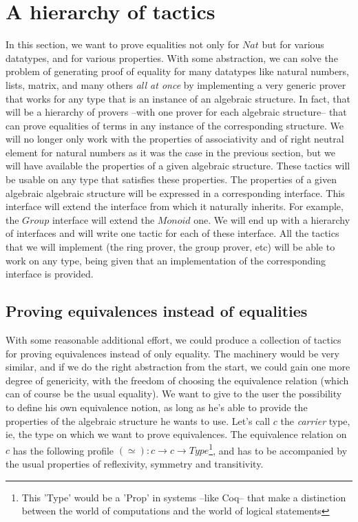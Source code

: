 \section{A hierarchy of tactics}

In this section, we want to prove equalities not only for $Nat$ but for various datatypes, and for various properties. With some abstraction, we can solve the problem of generating proof of equality for many datatypes like natural numbers, lists, matrix, and many others \emph{all at once} by implementing a very generic prover that works for any type that is an instance of an algebraic structure. In fact, that will be a hierarchy of provers --with one prover for each algebraic structure-- that can prove equalities of terms in any instance of the corresponding structure. We will no longer only work with the properties of associativity and of right neutral element for natural numbers as it was the case in the previous section, but we will have available the properties of a given algebraic structure. These tactics will be usable on any type that satisfies these properties. The properties of a given algebraic algebraic structure will be expressed in a corresponding interface. This interface will extend the interface from which it naturally inherits. For example, the $Group$ interface will extend the $Monoid$ one. We will end up with a hierarchy of interfaces and will write one tactic for each of these interface. All the tactics that we will implement (the ring prover, the group prover, etc) will be able to work on any type, being given that an implementation of the corresponding interface is provided.

	\subsection{Proving equivalences instead of equalities}
	
With some reasonable additional effort, we could produce a collection of tactics for proving equivalences instead of only equality. The machinery would be very similar, and if we do the right abstraction from the start, we could gain one more degree of genericity, with the freedom of choosing the equivalence relation (which can of course be the usual equality). We want to give to the user the possibility to define his own equivalence notion, as long as he's able to provide the properties of the algebraic structure he wants to use. Let's call $c$ the \emph{carrier} type, ie, the type on which we want to prove equivalences. The equivalence relation on $c$ has the following profile $(\simeq) : c \rightarrow c \rightarrow Type$\footnote{This 'Type' would be a 'Prop' in systems --like Coq-- that make a distinction between the world of computations and the world of logical statements}, and has to be accompanied by the usual properties of reflexivity, symmetry and transitivity.

